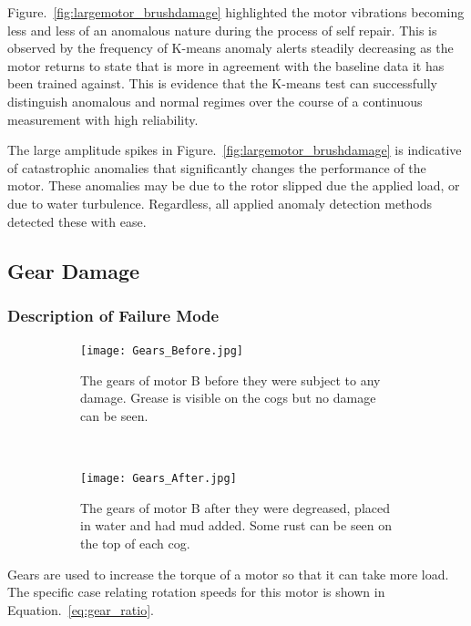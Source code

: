 Figure.~\ref{fig:largemotor_brushdamage} highlighted the motor vibrations becoming less and less of an anomalous nature during the process of self repair. This is observed by the frequency of K-means anomaly alerts steadily decreasing as the motor returns to state that is more in agreement with the baseline data it has been trained against. This is evidence that the K-means test can successfully distinguish anomalous and normal regimes over the course of a continuous measurement with high reliability.

The large amplitude spikes in Figure.~\ref{fig:largemotor_brushdamage} is indicative of catastrophic anomalies that significantly changes the performance of the motor. These anomalies may be due to the rotor slipped due the applied load, or due to water turbulence. Regardless, all applied anomaly detection methods detected these with ease.


\subsection{Gear Damage}

\subsubsection{Description of Failure Mode}

\begin{figure}[t!]
    \centering
    \begin{subfigure}[t]{0.5\textwidth}
        \centering
        \texttt{[image: Gears\_Before.jpg]}
        \caption[Healthy Gears]{The gears of motor B before they were subject to any damage. Grease is visible on the cogs but no damage can be seen.}
    \end{subfigure}%
    ~ 
    \begin{subfigure}[t]{0.5\textwidth}
        \centering
         \texttt{[image: Gears\_After.jpg]}
    \caption[Damaged Gears]{The gears of motor B after they were degreased, placed in water and had mud added. Some rust can be seen on the top of each cog.}
    \end{subfigure}
    \caption[Motor Gears]{}
    \label{fig:gear_damage}
\end{figure}

Gears are used to increase the torque of a motor so that it can take more load. The specific case relating rotation speeds for this motor is shown in Equation.~\eqref{eq:gear_ratio}.

